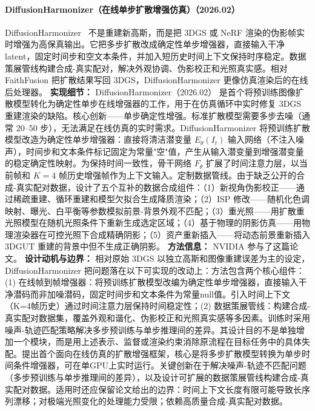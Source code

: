 \paragraph{DiffusionHarmonizer（在线单步扩散增强仿真）（2026.02）}
DiffusionHarmonizer~\cite{2602_24096} 不是重建新高斯，而是把 3DGS 或 NeRF 渲染的伪影帧实时增强为高保真输出。它把多步扩散改成确定性单步增强器，直接输入干净 latent，固定时间步和空文本条件，并加入短历史时间上下文保持时序稳定。数据策展管线构建合成-真实配对，解决外观协调、伪影校正和光照真实感。相对 FaithFusion 把扩散结果写回 3DGS，DiffusionHarmonizer 更像仿真渲染后的在线后处理器。
\textbf{实现细节：} DiffusionHarmonizer（2026.02） 是首个将预训练图像扩散模型转化为确定性单步在线增强器的工作，用于在仿真循环中实时修复 3DGS 重建渲染的缺陷。核心创新——单步确定性增强。标准扩散模型需要多步去噪（通常 20--50 步），无法满足在线仿真的实时需求。DiffusionHarmonizer 将预训练扩散模型改造为确定性单步增强器：直接将清洁潜变量 $E_\theta(I_t)$ 输入网络（不注入噪声），时间步和文本条件标记固定为常量"空"值，产生从输入潜变量到增强潜变量的稳定确定性映射。为保持时间一致性，骨干网络 $F_\theta$ 扩展了时间注意力层，以当前帧和 $K=4$ 帧历史增强帧作为上下文输入。定制数据管线。由于缺乏公开的合成-真实配对数据，设计了五个互补的数据合成组件：（1）新视角伪影校正——通过稀疏重建、循环重建和模型欠拟合生成降质渲染；（2）ISP 修改——随机化色调映射、曝光、白平衡等参数模拟前景-背景外观不匹配；（3）重光照——用扩散重光照模型在随机光照条件下重新生成选定区域；（4）基于物理的阴影仿真——用物理渲染器在可控光照下合成精确阴影；（5）资产重新插入——将动态前景重新插入 3DGUT 重建的背景中但不生成正确阴影。
\textbf{方法信息：} NVIDIA 参与了这篇论文。
\textbf{设计动机与边界：} 相对原始 3DGS 以独立高斯和图像重建误差为主的设定，DiffusionHarmonizer 把问题落在以下可实现的改动上：方法包含两个核心组件：(1) 在线帧到帧增强器：将预训练扩散模型改编为确定性单步增强器，直接输入干净潜码而非加噪潜码，固定时间步和文本条件为常量null值。引入时间上下文（K=4帧历史）通过时间注意力层保持时间稳定性；(2) 数据策展管线：构建合成-真实配对数据集，覆盖外观和谐化、伪影校正和光照真实感等多因素。训练时采用噪声-轨迹匹配策略解决多步预训练与单步推理间的差异。其设计目的不是单独增加一个模块，而是用上述表示、监督或渲染约束消除原流程在目标任务中的具体失配。提出首个面向在线仿真的扩散增强框架，核心是将多步扩散模型转换为单步时间条件增强器，可在单GPU上实时运行。关键创新在于解决噪声-轨迹不匹配问题（多步预训练与单步推理间的差异），以及设计可扩展的数据策展管线构建合成-真实配对数据。适用时还应保留论文给出的边界：时间上下文长度有限可能导致长序列漂移；对极端光照变化的处理能力受限；依赖高质量合成-真实配对数据。
